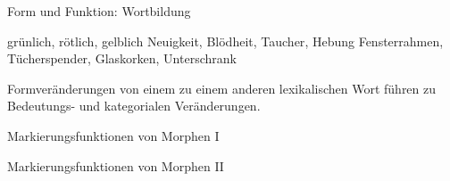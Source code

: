 \begin{frame}
  {Form und Funktion: Wortbildung}
  \pause
  \begin{exe}
    \ex grün\alert{lich}, röt\alert{lich}, gelb\alert{lich}
    \pause
    \ex Neu\alert{igkeit}, Blöd\alert{heit}, Tauch\alert{er}, Heb\alert{ung}
    \pause
    \ex Fenster\alert{rahmen}, Tücher\alert{spender}, Glas\alert{korken}, Unter\alert{schrank}
  \end{exe}
  \pause
  \Zeile
  Formveränderungen von einem zu einem anderen lexikalischen Wort führen zu Bedeutungs- und kategorialen Veränderungen.
\end{frame}

\begin{frame}
  {Markierungsfunktionen von Morphen I}
  \pause
  \begin{exe}
    \ex
    \begin{xlist}
    \end{xlist}
    \pause
    \ex
    \begin{xlist}
    \end{xlist}
  \end{exe}
\end{frame}

\begin{frame}
  {Markierungsfunktionen von Morphen II}
  \pause
  \begin{exe}
    \ex
    \begin{xlist}
    \end{xlist}
  \end{exe}
\end{frame}

